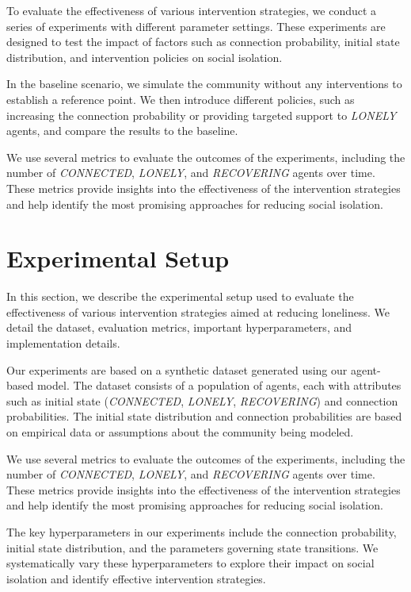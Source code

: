 \documentclass{article} %
\begin{document}
To evaluate the effectiveness of various intervention strategies, we conduct a series of experiments with different parameter settings. These experiments are designed to test the impact of factors such as connection probability, initial state distribution, and intervention policies on social isolation.

In the baseline scenario, we simulate the community without any interventions to establish a reference point. We then introduce different policies, such as increasing the connection probability or providing targeted support to \textit{LONELY} agents, and compare the results to the baseline.

We use several metrics to evaluate the outcomes of the experiments, including the number of \textit{CONNECTED}, \textit{LONELY}, and \textit{RECOVERING} agents over time. These metrics provide insights into the effectiveness of the intervention strategies and help identify the most promising approaches for reducing social isolation.

\section{Experimental Setup}
\label{sec:experimental}

In this section, we describe the experimental setup used to evaluate the effectiveness of various intervention strategies aimed at reducing loneliness. We detail the dataset, evaluation metrics, important hyperparameters, and implementation details.

Our experiments are based on a synthetic dataset generated using our agent-based model. The dataset consists of a population of agents, each with attributes such as initial state (\textit{CONNECTED}, \textit{LONELY}, \textit{RECOVERING}) and connection probabilities. The initial state distribution and connection probabilities are based on empirical data or assumptions about the community being modeled.

We use several metrics to evaluate the outcomes of the experiments, including the number of \textit{CONNECTED}, \textit{LONELY}, and \textit{RECOVERING} agents over time. These metrics provide insights into the effectiveness of the intervention strategies and help identify the most promising approaches for reducing social isolation.

The key hyperparameters in our experiments include the connection probability, initial state distribution, and the parameters governing state transitions. We systematically vary these hyperparameters to explore their impact on social isolation and identify effective intervention strategies.
\end{document}
